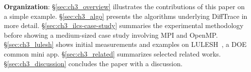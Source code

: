{\bf Organization\/}:
%
\S\ref{sec:ch3_overview} illustrates the contributions of this paper on a simple example.
%
\S\ref{sec:ch3_algo} presents the algorithms underlying DiffTrace in more detail.
%
\S\ref{sec:ch3_ilcs-case-study} summaries the experimental methodology before showing a medium-sized case study involving MPI and OpenMP.
%
\S\ref{sec:ch3_lulesh} shows initial measurements and examples on LULESH~\cite{LULESH2:changes}, a DOE common mini app.
%
\S\ref{sec:ch3_related} summarizes selected related works.
%
\S\ref{sec:ch3_discussion} concludes the paper with a discussion.

%
%
%
%
%
